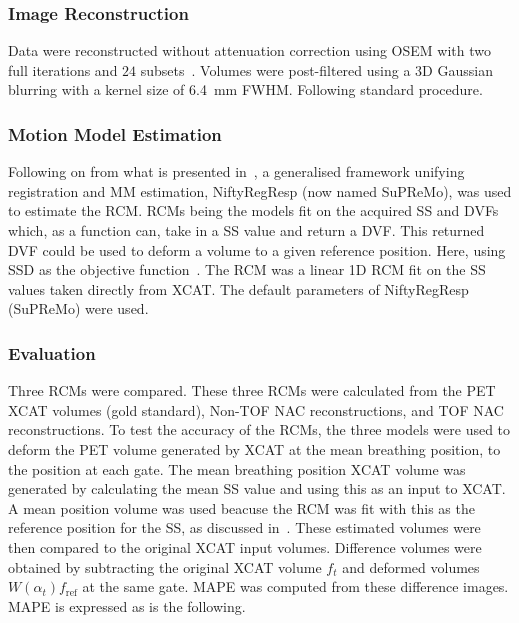             \subsubsection{Image Reconstruction} \label{sec:impact_of_tof_on_respiratory_motion_model_estimation_using_pre_gated_no_intra_cycle_motion_nac_pet_methods_image_reconstruction}
                Data were reconstructed without attenuation correction using \gls{OSEM} with two full iterations and $24$ subsets~\parencite{Hudson1994}. Volumes were post-filtered using a \gls{3D} Gaussian blurring with a kernel size of \SI{6.4}{\milli\metre} \gls{FWHM}. Following standard procedure.
            
            \subsubsection{Motion Model Estimation} \label{sec:impact_of_tof_on_respiratory_motion_model_estimation_using_pre_gated_no_intra_cycle_motion_nac_pet_methods_motion_model_estimation}
                Following on from what is presented in~, a generalised framework unifying registration and \gls{MM} estimation, NiftyRegResp (now named \gls{SuPReMo}), was used to estimate the \gls{RCM}. \glspl{RCM} being the models fit on the acquired \gls{SS} and \glspl{DVF} which, as a function can, take in a \gls{SS} value and return a \gls{DVF}. This returned \gls{DVF} could be used to deform a volume to a given reference position. Here, using \gls{SSD} as the objective function~\parencite{McClelland2017}. The \gls{RCM} was a linear \gls{1D} \gls{RCM} fit on the \gls{SS} values taken directly from \gls{XCAT}. The default parameters of NiftyRegResp (\gls{SuPReMo}) were used.
                
            \subsubsection{Evaluation} \label{sec:impact_of_tof_on_respiratory_motion_model_estimation_using_pre_gated_no_intra_cycle_motion_nac_pet_methods_evaluation}
                Three \glspl{RCM} were compared. These three \glspl{RCM} were calculated from the \gls{PET} \gls{XCAT} volumes (gold standard), \gls{Non-TOF} \gls{NAC} reconstructions, and \gls{TOF} \gls{NAC} reconstructions. To test the accuracy of the \glspl{RCM}, the three models were used to deform the \gls{PET} volume generated by \gls{XCAT} at the mean breathing position, to the position at each gate. The mean breathing position \gls{XCAT} volume was generated by calculating the mean \gls{SS} value and using this as an input to \gls{XCAT}. A mean position volume was used beacuse the \gls{RCM} was fit with this as the reference position for the \gls{SS}, as discussed in~. These estimated volumes were then compared to the original \gls{XCAT} input volumes. Difference volumes were obtained by subtracting the original \gls{XCAT} volume $f_t$ and deformed volumes $W(\alpha_t) f_\mathrm{ref}$ at the same gate. \gls{MAPE} was computed from these difference images. \gls{MAPE} is expressed as is the following.
                

